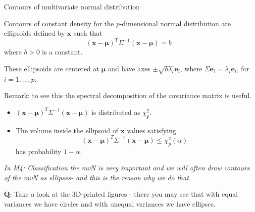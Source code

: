 \documentclass[ignorenonframetext,]{beamer}
\providecommand{\tightlist}{%
  \setlength{\itemsep}{0pt}\setlength{\parskip}{0pt}}
\begin{document}
\begin{frame}

\begin{block}{Contours of multivariate normal distribution}

Contours of constant density for the \(p\)-dimensional normal
distribution are ellipsoids defined by \(\mathbf{x}\) such that
\[ (\mathbf{x}-\mathbf{\mu})^T\Sigma^{-1}(\mathbf{x}-\mathbf{\mu})=b \]
where \(b>0\) is a constant.

These ellipsoids are centered at \(\mathbf{\mu}\) and have axes
\(\pm \sqrt{b \lambda_i}\mathbf{e}_i\), where
\(\Sigma\mathbf{e}_i=\lambda_i \mathbf{e}_i\), for \(i=1,...,p\).

Remark: to see this the spectral decomposition of the covariance matrix
is useful.

\begin{itemize}
\tightlist
\item
  \((\mathbf{x}-\mathbf{\mu})^T\Sigma^{-1}(\mathbf{x}-\mathbf{\mu})\) is
  distributed as \(\chi^2_p\).
\item
  The volume inside the ellipsoid of \(\mathbf{x}\) values satisfying
  \[ (\mathbf{x}-\mathbf{\mu})^T\Sigma^{-1}(\mathbf{x}-\mathbf{\mu}) \le \chi^2_p(\alpha) \]
  has probability \(1-\alpha\).
\end{itemize}

\end{block}

\end{frame}

\begin{frame}

\emph{In M4: Classification the mvN is very important and we will often
draw contours of the mvN as ellipses- and this is the reason why we do
that. }

\textbf{Q}: Take a look at the 3D-printed figures - there you may see
that with equal variances we have circles and with unequal variances we
have ellipses.

\end{frame}
\end{document}
